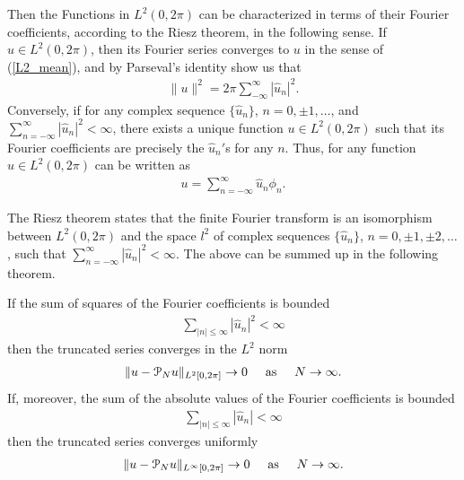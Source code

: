 	Then the Functions in $L^2 (0, 2 \pi)$ can be characterized in terms of their Fourier coefficients, according to the Riesz theorem, in the following sense. If $u \in L^2 (0, 2 \pi)$, then its Fourier series converges to $u$ in the sense of (\ref{L2_mean}), and by Parseval's identity show us that
	\begin{align}
	\label{parseval}
		\| u \|^2 = 2 \pi \displaystyle \sum^{\infty}_{-\infty} |\hat{u}_n|^2.
	\end{align}
	Conversely, if for any complex sequence $\{\hat{u}_n \}$, $n = 0, \pm 1, \dots $, and $\sum^{\infty}_{n=-\infty} |\hat{u}_n|^2 < \infty$, there exists a unique function $u \in L^2 (0, 2 \pi)$ such that its Fourier coefficients are precisely the $\hat{u}_n$$'$s for any $n$. Thus, for any function $u \in L^2 (0, 2 \pi)$ can be written as
	\begin{align}
		u = \displaystyle \sum^{\infty}_{n=-\infty} \hat{u}_n \phi_n.
	\end{align}
	
	The Riesz theorem states that the finite Fourier transform is an isomorphism between $L^2 (0, 2\pi)$ and the space $l^2$ of complex sequences $\{\hat{u}_n \}$, $n = 0, \pm1, \pm2, \dots$, such that $\sum^{\infty}_{n=-\infty} |\hat{u}_n|^2 < \infty$. The above can be summed up in the following theorem. 
	
	\begin{teor}
		 If the sum of squares of the Fourier coefficients is bounded
		\begin{align*}
			\displaystyle \sum_{ |n| \leq \infty} |\hat{u}_n|^2 < \infty
		\end{align*}
		then the truncated series converges in the $L^2$ norm
		\begin{align*}
			\|u -  \mathcal{P}_N u \|_{L^2 [0, 2\pi]} \rightarrow 0 \hspace{0.5cm} \text{as} \hspace{0.5cm} N \rightarrow \infty.
		\end{align*}
		If, moreover, the sum of the absolute values of the Fourier coefficients is bounded
		\begin{align*}
			\displaystyle \sum_{ |n| \leq \infty} |\hat{u}_n| < \infty
		\end{align*}
		then the truncated series converges uniformly 
		\begin{align*}
			\|u -  \mathcal{P}_N u \|_{L^{\infty} [0, 2\pi]} \rightarrow 0 \hspace{0.5cm} \text{as} \hspace{0.5cm} N \rightarrow \infty. 
		\end{align*}
	\end{teor}
	
